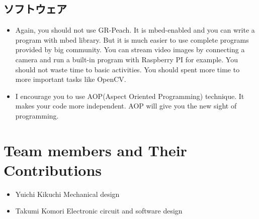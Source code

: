 \documentclass[journal]{IEEEtran}
\begin{document}
\subsection{ソフトウェア}
\begin{itemize}
    \item Again, you should not use GR-Peach.
    It is mbed-enabled and you can write a program with mbed library.
    But it is much easier to use complete programs provided by big community.
    You can stream video images by connecting a camera and run a built-in program with Raspberry PI for example.
    You should not waste time to basic activities.
    You should spent more time to more important tasks like OpenCV.
    \item I encourage you to use AOP(Aspect Oriented Programming) technique.
    It makes your code more independent.
    AOP will give you the new sight of programming.
\end{itemize}

\appendices

\section{Team members and Their Contributions}
\begin{itemize}
    \item Yuichi Kikuchi \hfill Mechanical design
    \item Takumi Komori \hfill Electronic circuit and software design
\end{itemize}
\end{document}
